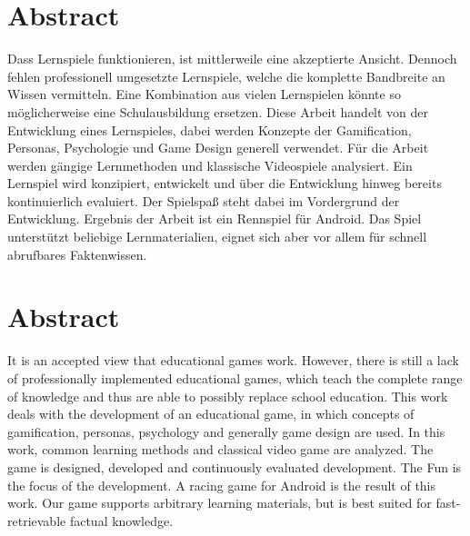 \section*{Abstract}
Dass Lernspiele funktionieren, ist mittlerweile eine akzeptierte Ansicht. Dennoch fehlen professionell umgesetzte Lernspiele, welche die komplette Bandbreite an Wissen vermitteln. Eine Kombination aus vielen Lernspielen könnte so möglicherweise eine Schulausbildung ersetzen.
Diese Arbeit handelt von der Entwicklung eines Lernspieles, dabei werden Konzepte der Gamification, Personas, Psychologie und Game Design generell verwendet. Für die Arbeit werden gängige Lernmethoden und klassische Videospiele analysiert. Ein Lernspiel wird konzipiert, entwickelt und über die Entwicklung hinweg bereits kontinuierlich evaluiert. Der Spielspaß steht dabei im Vordergrund der Entwicklung.
Ergebnis der Arbeit ist ein Rennspiel für Android. Das Spiel unterstützt beliebige Lernmaterialien, eignet sich aber vor allem für schnell abrufbares Faktenwissen.

\vfill

\section*{Abstract}
It is an accepted view that educational games work. However, there is still a lack of professionally implemented educational games, which teach the complete range of knowledge and thus are able to possibly replace school education.
This work deals with the development of an educational game, in which concepts of gamification, personas, psychology and generally game design are used. In this work, common learning methods and classical video game are analyzed. The game is designed, developed and continuously evaluated development. The Fun is the focus of the development.
A racing game for Android is the result of this work. Our game supports arbitrary learning materials, but is best suited for fast-retrievable factual knowledge.

\vfill\vfill\newpage
